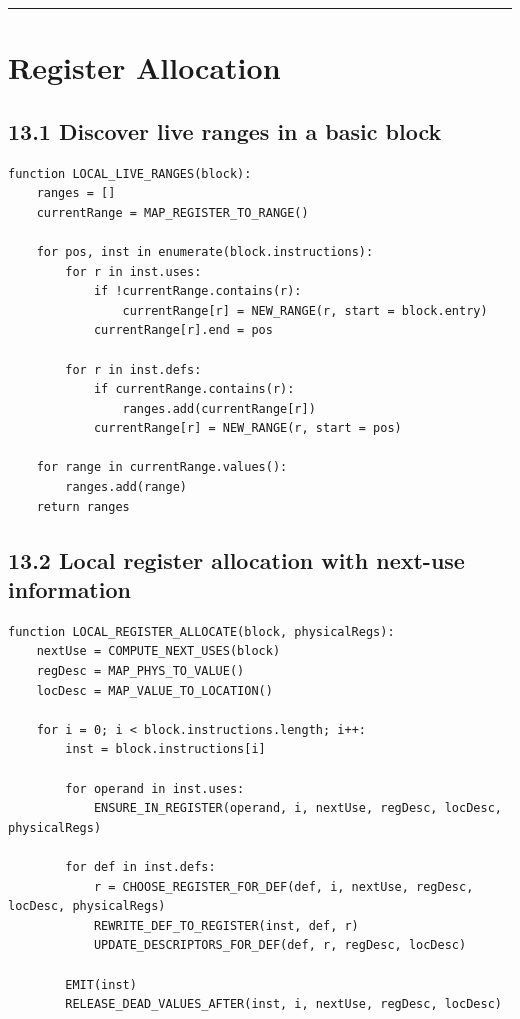 \documentclass[10pt,letterpaper]{article}
\begin{document}
\medskip\hrule\medskip

\clearpage
\section{Register Allocation}

\subsection*{13.1 Discover live ranges in a basic block}
{}

\begin{verbatim}
function LOCAL_LIVE_RANGES(block):
    ranges = []
    currentRange = MAP_REGISTER_TO_RANGE()

    for pos, inst in enumerate(block.instructions):
        for r in inst.uses:
            if !currentRange.contains(r):
                currentRange[r] = NEW_RANGE(r, start = block.entry)
            currentRange[r].end = pos

        for r in inst.defs:
            if currentRange.contains(r):
                ranges.add(currentRange[r])
            currentRange[r] = NEW_RANGE(r, start = pos)

    for range in currentRange.values():
        ranges.add(range)
    return ranges
\end{verbatim}

\subsection*{13.2 Local register allocation with next-use information}
{}

\begin{verbatim}
function LOCAL_REGISTER_ALLOCATE(block, physicalRegs):
    nextUse = COMPUTE_NEXT_USES(block)
    regDesc = MAP_PHYS_TO_VALUE()
    locDesc = MAP_VALUE_TO_LOCATION()

    for i = 0; i < block.instructions.length; i++:
        inst = block.instructions[i]

        for operand in inst.uses:
            ENSURE_IN_REGISTER(operand, i, nextUse, regDesc, locDesc, physicalRegs)

        for def in inst.defs:
            r = CHOOSE_REGISTER_FOR_DEF(def, i, nextUse, regDesc, locDesc, physicalRegs)
            REWRITE_DEF_TO_REGISTER(inst, def, r)
            UPDATE_DESCRIPTORS_FOR_DEF(def, r, regDesc, locDesc)

        EMIT(inst)
        RELEASE_DEAD_VALUES_AFTER(inst, i, nextUse, regDesc, locDesc)
\end{verbatim}
\end{document}
